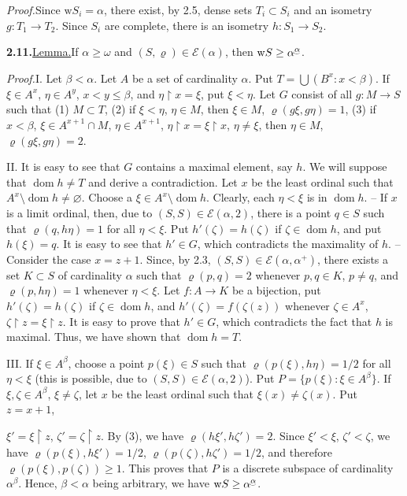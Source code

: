 \documentclass[12pt,a4paper]{article}
\newcommand{\E}{\mathcal{E}}
\newcommand{\dom}{\operatorname{dom}}
\newcommand{\wt}{\mathrm{w}}
\newcommand{\suprexp}[1]{\underaccent{\smile}{#1}}
\newcommand{\res}{\mathbin{\upharpoonright}}
\newcommand{\itemhead}[2]{\par\noindent\textbf{#1.}\enspace\underline{#2.}\enspace}
\newcommand{\prooftext}{\par\textit{Proof.}\enspace}
\begin{document}
\prooftext Since $\wt S_i=\alpha$, there exist, by 2.5, dense sets $T_i\subset S_i$ and an isometry $g:T_1\longrightarrow T_2$. Since $S_i$ are complete, there is an isometry $h:S_1\longrightarrow S_2$.

\itemhead{2.11}{Lemma}If $\alpha\geq\omega$ and $(S,\varrho)\in\E(\alpha)$, then $\wt S\geq\alpha^{\suprexp{\alpha}}$.

\prooftext I. Let $\beta<\alpha$. Let $A$ be a set of cardinality $\alpha$. Put $T=\bigcup(B^x:x<\beta)$. If $\xi\in A^x$, $\eta\in A^y$, $x<y\leq\beta$, and $\eta\res x=\xi$, put $\xi<\eta$. Let $G$ consist of all $g:M\longrightarrow S$ such that (1) $M\subset T$, (2) if $\xi<\eta$, $\eta\in M$, then $\xi\in M$, $\varrho(g\xi,g\eta)=1$, (3) if $x<\beta$, $\xi\in A^{x+1}\cap M$, $\eta\in A^{x+1}$, $\eta\res x=\xi\res x$, $\eta\ne\xi$, then $\eta\in M$, $\varrho(g\xi,g\eta)=2$.

II. It is easy to see that $G$ contains a maximal element, say $h$. We will suppose that $\dom h\ne T$ and derive a contradiction. Let $x$ be the least ordinal such that $A^x\setminus\dom h\ne\varnothing$. Choose a $\xi\in A^x\setminus\dom h$. Clearly, each $\eta<\xi$ is in $\dom h$. -- If $x$ is a limit ordinal, then, due to $(S,S)\in\E(\alpha,2)$, there is a point $q\in S$ such that $\varrho(q,h\eta)=1$ for all $\eta<\xi$. Put $h'(\zeta)=h(\zeta)$ if $\zeta\in\dom h$, and put $h(\xi)=q$. It is easy to see that $h'\in G$, which contradicts the maximality of $h$. -- Consider the case $x=z+1$. Since, by 2.3, $(S,S)\in\E(\alpha,\alpha^+)$, there exists a set $K\subset S$ of cardinality $\alpha$ such that $\varrho(p,q)=2$ whenever $p,q\in K$, $p\ne q$, and $\varrho(p,h\eta)=1$ whenever $\eta<\xi$. Let $f:A\longrightarrow K$ be a bijection, put $h'(\zeta)=h(\zeta)$ if $\zeta\in\dom h$, and $h'(\zeta)=f(\zeta(z))$ whenever $\zeta\in A^x$, $\zeta\res z=\xi\res z$. It is easy to prove that $h'\in G$, which contradicts the fact that $h$ is maximal. Thus, we have shown that $\dom h=T$.

III. If $\xi\in A^\beta$, choose a point $p(\xi)\in S$ such that $\varrho(p(\xi),h\eta)=1/2$ for all $\eta<\xi$ (this is possible, due to $(S,S)\in\E(\alpha,2)$). Put $P=\{p(\xi):\xi\in A^\beta\}$. If $\xi,\zeta\in A^\beta$, $\xi\ne\zeta$, let $x$ be the least ordinal such that $\xi(x)\ne\zeta(x)$. Put $z=x+1$,

\newpage %
\noindent $\xi'=\xi\res z$, $\zeta'=\zeta\res z$. By (3), we have $\varrho(h\xi',h\zeta')=2$. Since $\xi'<\xi$, $\zeta'<\zeta$, we have $\varrho(p(\xi),h\xi')=1/2$, $\varrho(p(\zeta),h\zeta')=1/2$, and therefore $\varrho(p(\xi),p(\zeta))\geq1$. This proves that $P$ is a discrete subspace of cardinality $\alpha^\beta$. Hence, $\beta<\alpha$ being arbitrary, we have $\wt S\geq\alpha^{\suprexp{\alpha}}$.
\end{document}
